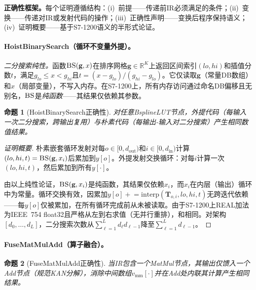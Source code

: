 \documentclass[journal,onecolumn]{IEEEtran}
\theoremstyle{definition}
\theoremstyle{plain}
\newtheorem{proposition}{命题}
\theoremstyle{remark}
\begin{document}
\textbf{正确性框架。}每个证明遵循结构：(i)~前提——传递前IR必须满足的条件；(ii)~变换——传递对IR或发射代码的操作；(iii)~正确性声明——变换后程序保持语义；(iv)~证明概要——基于S7-1200语义的半形式论证。

\paragraph{HoistBinarySearch（循环不变量外提）。}

\textit{二分搜索纯性。}函数$\textsc{BS}(\mathbf{g}, x)$在排序网格$\mathbf{g} \in \mathbb{R}^K$上返回区间索引$(lo, hi)$和插值分数$t$，满足$g_{lo} \leq x < g_{hi}$且$t = (x-g_{lo})/(g_{hi}-g_{lo})$。它仅读取$\mathbf{g}$（常量DB数组）和$x$（局部变量），不写入内存。在S7-1200上，所有内存访问通过命名DB偏移且无别名，$\textsc{BS}$是\textit{纯函数}——其结果仅依赖其参数。

\begin{proposition}[HoistBinarySearch正确性]
\label{prop:hoist_sound}
对任意BsplineLUT节点，外提代码（每输入一次二分搜索，跨输出复用）与朴素代码（每输出-输入对二分搜索）产生相同数值结果。
\end{proposition}

\begin{proof}[证明概要]
朴素嵌套循环发射对每$o \in [0, d_{\text{out}})$和$i \in [0, d_{\text{in}})$计算$(lo, hi, t) = \textsc{BS}(\mathbf{g}, x_i)$后累加到$y[o]$。外提发射交换循环：对每$i$计算一次$(lo, hi, t)$，然后累加到所有$y[\cdot]$。

由以上纯性论证，$\textsc{BS}(\mathbf{g}, x_i)$是纯函数，其结果仅依赖$x_i$，而$x_i$在内层（输出）循环中为常量。循环交换有效，因累加$y[o] \mathrel{+}= \text{interp}(\mathbf{T}_{o,i}, lo, hi, t)$无跨迭代依赖——每$y[o]$仅被累加，在所有循环完成前从未被读取。由于S7-1200上REAL加法为IEEE~754 float32且严格从左到右求值（无并行重排），和相同。对架构$[d_0,\dots,d_L]$，二分搜索次数从$\sum_{\ell=1}^L d_\ell d_{\ell-1}$降至$\sum_{\ell=1}^L d_{\ell-1}$。
\end{proof}

\paragraph{FuseMatMulAdd（算子融合）。}

\begin{proposition}[FuseMatMulAdd正确性]
\label{prop:fuse_sound}
当IR包含一个MatMul节点，其输出\textit{仅}馈入一个Add节点（规范KAN分解），消除中间数组$v_{\text{mm}}[\cdot]$并在Add处内联其计算产生相同结果。
\end{proposition}
\end{document}
